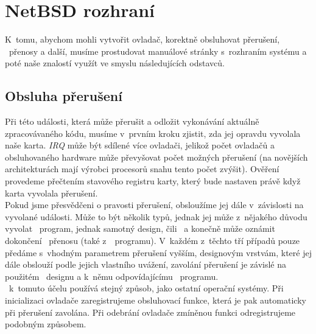   \section{NetBSD rozhraní}
  K~tomu, abychom mohli vytvořit ovladač, korektně obsluhovat přerušení,
  \dma\ přenosy a další, musíme prostudovat manuálové stránky s~rozhraním
  systému a poté naše znalostí využít ve smyslu následujících odstavců.
  \subsection{Obsluha přerušení}
  Při této události, která může přerušit a odložit vykonávání aktuálně
  zpracovávaného kódu, musíme v~prvním kroku zjistit, zda jej opravdu vyvolala
  naše karta. \emph{IRQ} může být sdílené více ovladači, jelikož počet
  ovladačů a
  obsluhovaného hardware může převyšovat počet možných přerušení (na novějších
  architekturách mají výrobci procesorů snahu tento počet zvýšit). Ověření
  provedeme přečtením stavového registru karty, který bude nastaven právě když
  karta vyvolala přerušení. \\ \indent
  Pokud jsme přesvědčeni o pravosti přerušení, obsloužíme jej dále
  v~závislosti na vyvolané události. Může to být několik typů, jednak jej může
  z~nějakého důvodu vyvolat \ppc\ program, jednak samotný design, čili \fpga\ a
  konečně může oznámit dokončení \dma\ přenosu (také z~\ppc\
  programu). V~každém z~těchto tří případů pouze předáme s~vhodným parametrem
  přerušení vyšším, designovým vrstvám, které jej dále obslouží podle jejich
  vlastního uvážení, zavolání přerušení je závislé na použitém \fpga\ designu
  a k~němu odpovídajícímu \ppc\ programu. \\ \indent
  \nbsd\ k~tomuto účelu používá stejný způsob, jako ostatní operační systémy.
  Při inicializaci ovladače zaregistrujeme obsluhovací funkce, která je pak
  automaticky při přerušení zavolána. Při odebrání ovladače zmíněnou funkci
  odregistrujeme podobným způsobem.
